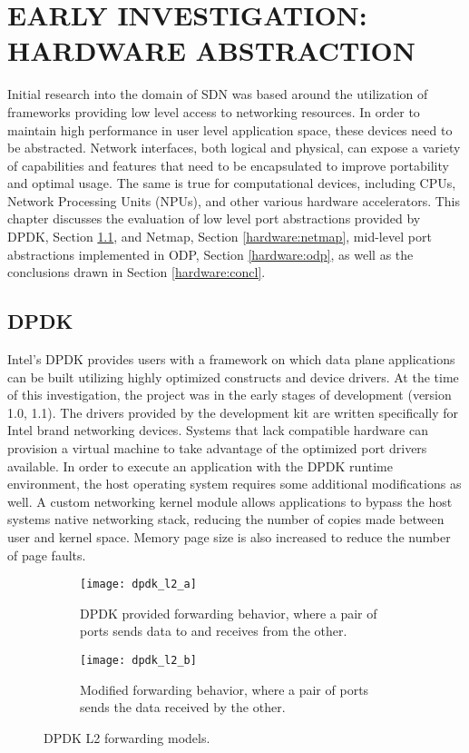 \chapter{EARLY INVESTIGATION: HARDWARE ABSTRACTION}
\label{hardware}
Initial research into the domain of SDN was based around the utilization
of frameworks providing low level access to networking resources. In order
to maintain high performance in user level application space, these devices
need to be abstracted. Network interfaces, both logical and physical, can
expose a variety of capabilities and features that need to be encapsulated
to improve portability and optimal usage. The same is true for computational
devices, including CPUs, Network Processing Units (NPUs), and other various
hardware accelerators. This chapter discusses the evaluation of low level
port abstractions provided by DPDK, Section \ref{hardware:dpdk}, and Netmap,
Section \ref{hardware:netmap}, mid-level port abstractions implemented in ODP,
Section \ref{hardware:odp}, as well as the conclusions drawn in Section
\ref{hardware:concl}.

\section{DPDK}
\label{hardware:dpdk}
Intel's DPDK provides users with a framework on which data plane applications
can be built utilizing highly optimized constructs and device drivers. At the
time of this investigation, the project was in the early stages of development
(version 1.0, 1.1). The drivers provided by the development kit are written
specifically for Intel brand networking devices. Systems that lack compatible
hardware can provision a virtual machine to take advantage of the optimized
port drivers available. In order to execute an application with the DPDK runtime
environment, the host operating system requires some additional modifications
as well. A custom networking kernel module allows applications to bypass the
host systems native networking stack, reducing the number of copies made
between user and kernel space. Memory page size is also increased to reduce
the number of page faults.

\begin{figure}[h]
  \centering
  \begin{subfigure}[b]{0.48\textwidth}
    \centering
    \texttt{[image: dpdk\_l2\_a]}
    \caption{DPDK provided forwarding behavior, where a pair of ports sends
    data to and receives from the other.}
  \end{subfigure}
  \hfill
  \begin{subfigure}[b]{0.48\textwidth}
    \centering
    \texttt{[image: dpdk\_l2\_b]}
    \caption{Modified forwarding behavior, where a pair of ports sends the data
    received by the other.}
  \end{subfigure}
  \caption{DPDK L2 forwarding models.}
  \label{dpdk_l2}
\end{figure}


